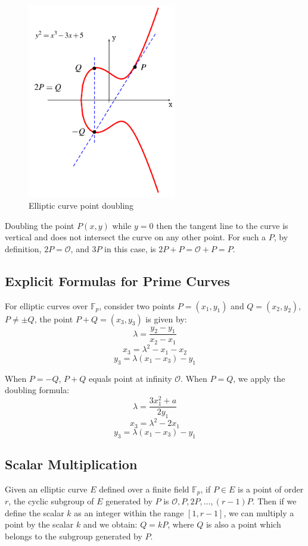     \begin{figure}[h!]
    	\centering
    	\includegraphics[width=65mm]{./pics/ecc_point_doubling.png}
    	\caption{Elliptic curve point doubling}
    	\label{fig:ecc_point_doubling}
    \end{figure}
    
Doubling the point $P(x,y)$ while $ y=0 $ then the tangent line to the curve is vertical and does not intersect the curve on any other point. For such a $P$, by definition, $2P=\mathcal{O}$, and $3P$ in this case, is $2P+P = \mathcal{O} + P = P$.   

\subsection*{Explicit Formulas for Prime Curves} \label{sec:affine_formulas}
For elliptic curves over $\mathbb{F}_p$, consider two points $P=(x_1,y_1)$ and $Q=(x_2,y_2)$, $P \neq \pm Q$, the point $P+Q = (x_3,y_3)$ is given by:
$$\lambda = \frac{y_2-y_1}{x_2-x_1}$$
$$x_3=\lambda^2-x_1-x_2$$
$$y_3=\lambda(x_1-x_3)-y_1$$

When $P=-Q$, $P+Q$ equals point at infinity $\mathcal{O}$. When $P=Q$, we apply the doubling formula:
$$\lambda = \frac{3x_1^2+a}{2y_1}$$
$$x_3=\lambda^2-2x_1$$
$$y_3=\lambda(x_1-x_3)-y_1$$



\subsection*{Scalar Multiplication}
Given an elliptic curve $E$ defined over a finite field $\mathbb{F}_p$, if $P \in E$ is a point of order $r$, the cyclic subgroup of $E$ generated by $P$ is ${\mathcal{O},P,2P,\ldots,(r-1)P}$. Then if we define the scalar $k$ as an integer within the range $[1,r-1]$, we can multiply a point by the scalar $k$ and we obtain: $Q=kP$, where $Q$ is also a point which belongs to the subgroup generated by $P$. 

